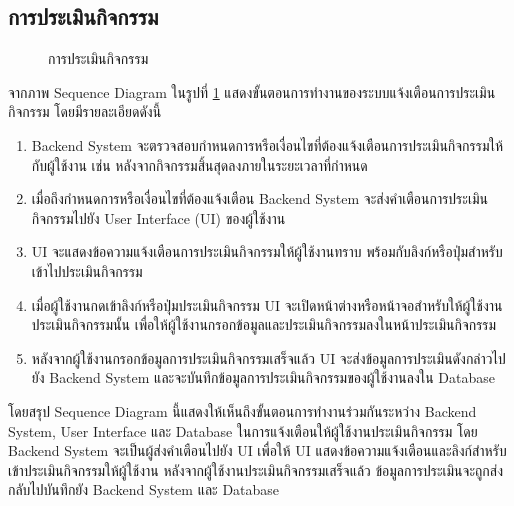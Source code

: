 \documentclass[14pt,oneside,openright,a4paper]{cpe-thai-project}
\begin{document}
\subsection{การประเมินกิจกรรม}

  \begin{figure}[!h]\centering
    \setlength{\fboxrule}{0.5mm} %
    \setlength{\fboxsep}{0.5cm}
    \caption{การประเมินกิจกรรม}\label{fig:Event evaluation}
  \end{figure}

  จากภาพ Sequence Diagram ในรูปที่ \ref{fig:Event evaluation} แสดงขั้นตอนการทำงานของระบบแจ้งเตือนการประเมินกิจกรรม โดยมีรายละเอียดดังนี้
  \begin{enumerate}
    \item Backend System จะตรวจสอบกำหนดการหรือเงื่อนไขที่ต้องแจ้งเตือนการประเมินกิจกรรมให้กับผู้ใช้งาน เช่น หลังจากกิจกรรมสิ้นสุดลงภายในระยะเวลาที่กำหนด
    \item เมื่อถึงกำหนดการหรือเงื่อนไขที่ต้องแจ้งเตือน Backend System จะส่งคำเตือนการประเมินกิจกรรมไปยัง User Interface (UI) ของผู้ใช้งาน
    \item UI จะแสดงข้อความแจ้งเตือนการประเมินกิจกรรมให้ผู้ใช้งานทราบ พร้อมกับลิงก์หรือปุ่มสำหรับเข้าไปประเมินกิจกรรม
    \item เมื่อผู้ใช้งานกดเข้าลิงก์หรือปุ่มประเมินกิจกรรม UI จะเปิดหน้าต่างหรือหน้าจอสำหรับให้ผู้ใช้งานประเมินกิจกรรมนั้น เพื่อให้ผู้ใช้งานกรอกข้อมูลและประเมินกิจกรรมลงในหน้าประเมินกิจกรรม
    \item หลังจากผู้ใช้งานกรอกข้อมูลการประเมินกิจกรรมเสร็จแล้ว UI จะส่งข้อมูลการประเมินดังกล่าวไปยัง Backend System และจะบันทึกข้อมูลการประเมินกิจกรรมของผู้ใช้งานลงใน Database
  \end{enumerate}
  โดยสรุป Sequence Diagram นี้แสดงให้เห็นถึงขั้นตอนการทำงานร่วมกันระหว่าง Backend System, User Interface และ Database ในการแจ้งเตือนให้ผู้ใช้งานประเมินกิจกรรม โดย Backend System จะเป็นผู้ส่งคำเตือนไปยัง UI เพื่อให้ UI แสดงข้อความแจ้งเตือนและลิงก์สำหรับเข้าประเมินกิจกรรมให้ผู้ใช้งาน หลังจากผู้ใช้งานประเมินกิจกรรมเสร็จแล้ว ข้อมูลการประเมินจะถูกส่งกลับไปบันทึกยัง Backend System และ Database
\end{document}
